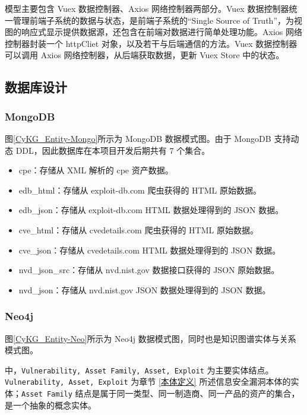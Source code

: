 \documentclass[a4paper,AutoFakeBold,oneside,12pt]{book}
\begin{document}
模型主要包含 Vuex 数据控制器、Axios 网络控制器两部分。Vuex 数据控制器统一管理前端子系统的数据与状态，是前端子系统的“Single Source of Truth”，为视图的响应式显示提供数据源，还包含在前端对数据进行简单处理功能。Axios 网络控制器封装一个 httpCliet 对象，以及若干与后端通信的方法。Vuex 数据控制器可以调用 Axios 网络控制器，从后端获取数据，更新 Vuex Store 中的状态。

\subsection{数据库设计}

\subsubsection{MongoDB}

图\ref{CyKG_Entity-Mongo}所示为 MongoDB 数据模式图。由于 MongoDB 支持动态 DDL，因此数据库在本项目开发后期共有 7 个集合。
\begin{itemize}
	\item cpe：存储从 XML 解析的 cpe 资产数据。
	\item edb{\_}html：存储从 exploit-db.com 爬虫获得的 HTML 原始数据。
	\item edb{\_}json：存储从 exploit-db.com HTML 数据处理得到的 JSON 数据。
	\item cve{\_}html：存储从 cvedetails.com 爬虫获得的 HTML 原始数据。
	\item cve{\_}json：存储从 cvedetails.com HTML 数据处理得到的 JSON 数据。
	\item nvd{\_}json{\_}src：存储从 nvd.nist.gov 数据接口获得的 JSON 原始数据。
	\item nvd{\_}json：存储从 nvd.nist.gov JSON 数据处理得到的 JSON 数据。
\end{itemize}


\subsubsection{Neo4j}

图\ref{CyKG_Entity-Neo}所示为 Neo4j 数据模式图，同时也是知识图谱实体与关系模式图。


中，\lstinline|Vulnerability, Asset Family, Asset, Exploit| 为主要实体结点。\lstinline|Vulnerability, Asset, Exploit| 为章节 \ref{本体定义} 所述信息安全漏洞本体的实体；\lstinline|Asset Family| 结点是属于同一类型、同一制造商、同一产品的资产的集合，是一个抽象的概念实体。
\end{document}
